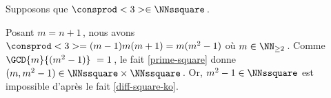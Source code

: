Supposons que $\consprod<3> \in \NNssquare$\,.

\smallskip

Posant $m = n+1$\,, nous avons $\consprod<3> = (m-1)m(m+1) = m(m^2 - 1)$ où $m \in \NN_{\geq 2}$\,.
%
Comme $\GCD{m}{(m^2 - 1)} = 1$\,, le fait \ref{prime-square} donne $(m, m^2 - 1) \in \NNssquare \times \NNssquare$\,.
Or, $m^2 - 1 \in \NNssquare$ est impossible d'après le fait \ref{diff-square-ko}.